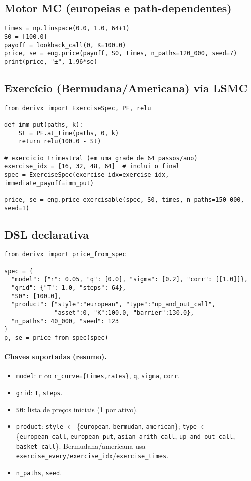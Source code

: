 \documentclass[11pt,a4paper]{article}
\begin{document}
\subsection{Motor MC (europeias e path-dependentes)}
\begin{lstlisting}[style=pystyle]
times = np.linspace(0.0, 1.0, 64+1)
S0 = [100.0]
payoff = lookback_call(0, K=100.0)
price, se = eng.price(payoff, S0, times, n_paths=120_000, seed=7)
print(price, "±", 1.96*se)
\end{lstlisting}

\subsection{Exercício (Bermudana/Americana) via LSMC}
\begin{lstlisting}[style=pystyle]
from derivx import ExerciseSpec, PF, relu

def imm_put(paths, k):
    St = PF.at_time(paths, 0, k)
    return relu(100.0 - St)

# exercicio trimestral (em uma grade de 64 passos/ano)
exercise_idx = [16, 32, 48, 64]  # inclui o final
spec = ExerciseSpec(exercise_idx=exercise_idx, immediate_payoff=imm_put)

price, se = eng.price_exercisable(spec, S0, times, n_paths=150_000, seed=1)
\end{lstlisting}

\subsection{DSL declarativa}
\begin{lstlisting}[style=pystyle]
from derivx import price_from_spec

spec = {
  "model": {"r": 0.05, "q": [0.0], "sigma": [0.2], "corr": [[1.0]]},
  "grid": {"T": 1.0, "steps": 64},
  "S0": [100.0],
  "product": {"style":"european", "type":"up_and_out_call",
              "asset":0, "K":100.0, "barrier":130.0},
  "n_paths": 40_000, "seed": 123
}
p, se = price_from_spec(spec)
\end{lstlisting}

\paragraph{Chaves suportadas (resumo).}
\begin{itemize}[leftmargin=1.2em]
\item \texttt{model}: \texttt{r} ou \texttt{r\_curve=\{times,rates\}}, \texttt{q}, \texttt{sigma}, \texttt{corr}.
\item \texttt{grid}: \texttt{T}, \texttt{steps}.
\item \texttt{S0}: lista de preços iniciais (1 por ativo).
\item \texttt{product}: \texttt{style} $\in$ \{\texttt{european}, \texttt{bermudan}, \texttt{american}\};
\texttt{type} $\in$ \{\texttt{european\_call}, \texttt{european\_put}, \texttt{asian\_arith\_call},
\texttt{up\_and\_out\_call}, \texttt{basket\_call}\}. Bermudana/americana usa
\texttt{exercise\_every}/\texttt{exercise\_idx}/\texttt{exercise\_times}.
\item \texttt{n\_paths}, \texttt{seed}.
\end{itemize}
\end{document}
